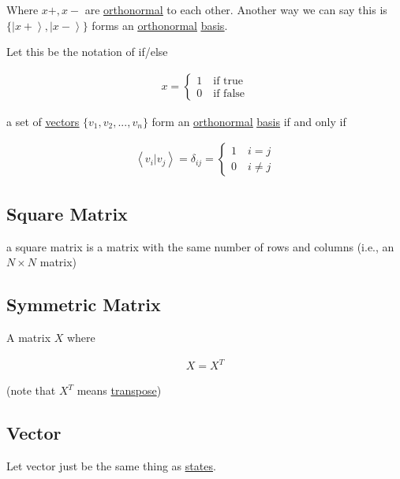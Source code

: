 \documentclass[
]{article}
\let\oldhyperref\hyperref
\renewcommand{\hyperref}[2][]{\oldhyperref[#1]{\underline{#2}}}
\providecommand{\ket}[1]{\left\lvert #1 \right\rangle}
\providecommand{\braket}[1]{\left\langle #1 \right\rangle}
\begin{document}
Where \(x+,x-\) are \hyperref[orthonormality]{orthonormal} to each other. Another way we can say
this is \(\{\ket{x+},\ket{x-}\}\) forms an \hyperref[orthonormality]{orthonormal} \hyperref[basis-states]{basis}.

Let this be the notation of if/else

\begin{gather*}
	x=\begin{cases}1\quad\text{if true}\\0\quad\text{if false}\end{cases}
\end{gather*}

a set of \hyperref[vectors]{vectors} \(\{v_1,v_2,...,v_n\}\) form an \hyperref[orthonormality]{orthonormal} \hyperref[basis-states]{basis} if
and only if

\begin{gather*}
	\braket{v_i|v_j}=\delta_{ij}=\begin{cases}1\quad i=j\\0\quad i\neq j\end{cases}
\end{gather*}

\subsection{Square Matrix}\label{square-matrix}

a square matrix is a matrix with the same number of rows and columns
(i.e., an \(N\times N\) matrix)

\subsection{Symmetric Matrix}\label{symmetric-matrix}

A matrix \(X\) where

\begin{gather*}
	X=X^T
\end{gather*}

(note that \(X^T\) means
\href{https://www.notion.so/Going-from-1-1-2-to-Understanding-Quantum-Mechanics-344d7c8acbf380088bbdfa6e9ac17c16?pvs=21}{transpose})



\subsection{Vector}\label{vectors}

Let vector just be the same thing as
\hyperref[ket-states]{states}.
\end{document}
